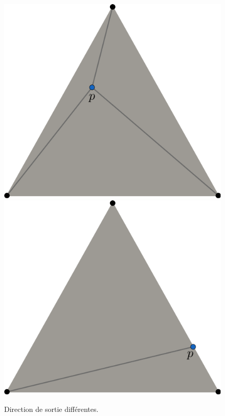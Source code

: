 \begin{figure}[h!]
\centering
\includegraphics[scale=0.37]{images/insert_pt_1.pdf}\hfill
\includegraphics[scale=0.37]{images/insert_pt_2.pdf}
\caption{Direction de sortie différentes.}
\label{fig:insert_pt}
\end{figure}

